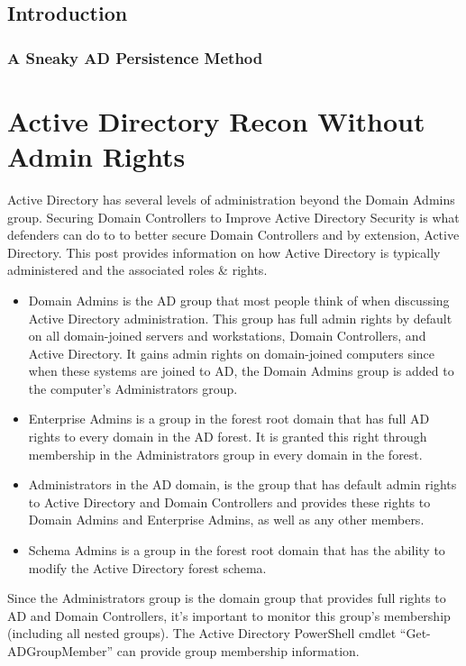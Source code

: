 \subsection{Introduction}

\subsubsection{A Sneaky AD Persistence Method}

\section{Active Directory Recon Without Admin Rights}

Active Directory has several levels of administration beyond the Domain Admins group. Securing Domain Controllers to Improve Active Directory Security is what defenders can do to to better secure Domain Controllers and by extension, Active Directory. This post provides information on how Active Directory is typically administered and the associated roles \& rights.

\begin{itemize}
    \item Domain Admins is the AD group that most people think of when discussing Active Directory administration. This group has full admin rights by default on all domain-joined servers and workstations, Domain Controllers, and Active Directory. It gains admin rights on domain-joined computers since when these systems are joined to AD, the Domain Admins group is added to the computer’s Administrators group.
    \item Enterprise Admins is a group in the forest root domain that has full AD rights to every domain in the AD forest. It is granted this right through membership in the Administrators group in every domain in the forest.
    \item Administrators in the AD domain, is the group that has default admin rights to Active Directory and Domain Controllers and provides these rights to Domain Admins and Enterprise Admins, as well as any other members.
    \item Schema Admins is a group in the forest root domain that has the ability to modify the Active Directory forest schema.
\end{itemize}
Since the Administrators group is the domain group that provides full rights to AD and Domain Controllers, it’s important to monitor this group’s membership (including all nested groups). The Active Directory PowerShell cmdlet “Get-ADGroupMember” can provide group membership information.

